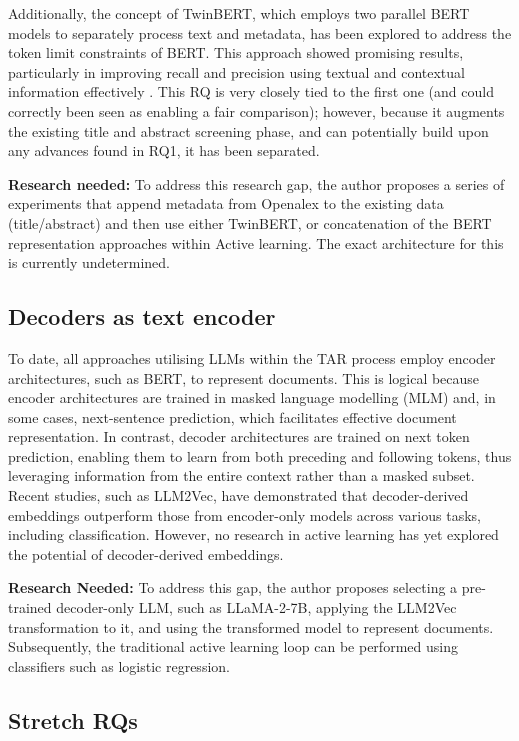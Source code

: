 \documentclass[../main.tex]{subfiles}
\begin{document}
Additionally, the concept of TwinBERT, which employs two parallel BERT models to separately process text and metadata, has been explored to address the token limit constraints of BERT. This approach showed promising results, particularly in improving recall and precision using textual and contextual information effectively \cite{wolff_enriched_2024}. This RQ is very closely tied to the first one (and could correctly been seen as enabling a fair comparison); however, because it augments the existing title and abstract screening phase, and can potentially build upon any advances found in RQ1, it has been separated.

\textbf{Research needed:} To address this research gap, the author proposes a series of experiments that append metadata from Openalex to the existing data (title/abstract) and then use either TwinBERT, or concatenation of the BERT representation approaches within Active learning. The exact architecture for this is currently undetermined.

\subsection{Decoders as text encoder}

To date, all approaches utilising LLMs within the TAR process employ encoder architectures, such as BERT, to represent documents. This is logical because encoder architectures are trained in masked language modelling (MLM) and, in some cases, next-sentence prediction, which facilitates effective document representation. In contrast, decoder architectures are trained on next token prediction, enabling them to learn from both preceding and following tokens, thus leveraging information from the entire context rather than a masked subset. Recent studies, such as LLM2Vec\cite{behnamghader_llm2vec_2024}, have demonstrated that decoder-derived embeddings outperform those from encoder-only models across various tasks, including classification. However, no research in active learning has yet explored the potential of decoder-derived embeddings.

\textbf{Research Needed: }To address this gap, the author proposes selecting a pre-trained decoder-only LLM, such as LLaMA-2-7B, applying the LLM2Vec transformation to it, and using the transformed model to represent documents. Subsequently, the traditional active learning loop can be performed using classifiers such as logistic regression.

\subsection{Stretch RQs}
\end{document}
